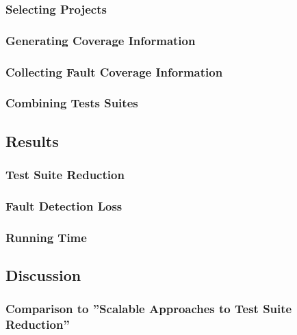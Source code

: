 \documentclass[a4paper,10pt]{article}
\begin{document}
\subsubsection{Selecting Projects}


\subsubsection{Generating Coverage Information}


\subsubsection{Collecting Fault Coverage Information}


\subsubsection{Combining Tests Suites}

\subsection{Results}

\subsubsection{Test Suite Reduction}

\subsubsection{Fault Detection Loss}

\subsubsection{Running Time}

\subsection{Discussion}

\subsubsection{Comparison to ''Scalable Approaches to Test Suite Reduction''}
\end{document}
